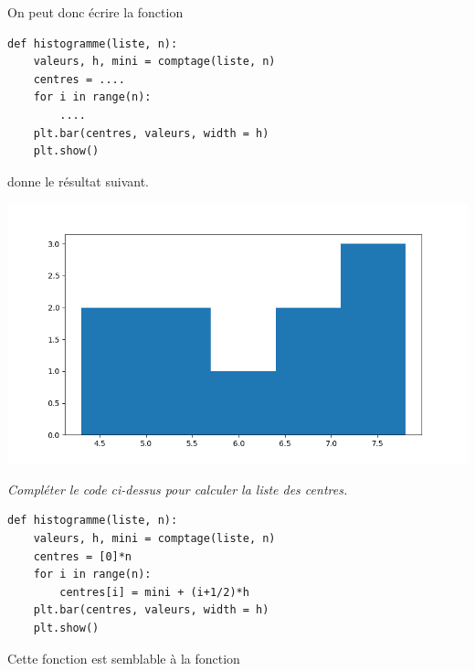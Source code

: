 \newpage
On peut donc écrire la fonction
\begin{lstlisting}
def histogramme(liste, n):
    valeurs, h, mini = comptage(liste, n)
    centres = ....
    for i in range(n):
        ....
    plt.bar(centres, valeurs, width = h)
    plt.show()
\end{lstlisting}
 donne le résultat suivant.
\begin{center}
\includegraphics[scale=0.4]{TP/Images/TP17_histo2.png}
\end{center}
\begin{Exercise}\it 
Compléter le code ci-dessus pour calculer la liste des centres.
\end{Exercise}
\begin{Answer}
\begin{lstlisting}
def histogramme(liste, n):
    valeurs, h, mini = comptage(liste, n)
    centres = [0]*n
    for i in range(n):
        centres[i] = mini + (i+1/2)*h
    plt.bar(centres, valeurs, width = h)
    plt.show()
\end{lstlisting}
\end{Answer}
Cette fonction est semblable à la fonction 
